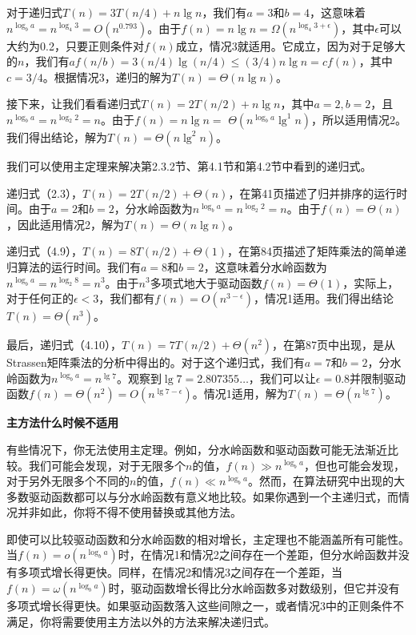 \documentclass[lang=cn,newtx,10pt,scheme=chinese]{elegantbook}
\begin{document}
对于递归式$T(n)=3 T(n / 4)+n \lg n$，我们有$a=3$和$b=4$，这意味着$n^{\log _b a}=n^{\log _4 3}=O\left(n^{0.793}\right)$。由于$f(n)=n \lg n=\Omega\left(n^{\log _4 3+\epsilon}\right)$，其中$\epsilon$可以大约为0.2，只要正则条件对$f(n)$成立，情况3就适用。它成立，因为对于足够大的$n$，我们有$a f(n / b)=3(n / 4) \lg (n / 4) \leq(3 / 4) n \lg n=c f(n)$，其中$c=3 / 4$。根据情况3，递归的解为$T(n)=\Theta(n \lg n)$。

接下来，让我们看看递归式$T(n)=2 T(n / 2)+n \lg n$，其中$a=2, b=2$，且$n^{\log _b a}=n^{\log _2 2}=n$。由于$f(n)=n \lg n=$ $\Theta\left(n^{\log _b a} \lg ^1 n\right)$，所以适用情况2。我们得出结论，解为$T(n)=\Theta\left(n \lg ^2 n\right)$。

我们可以使用主定理来解决第2.3.2节、第4.1节和第4.2节中看到的递归式。

递归式（2.3），$T(n)=2 T(n / 2)+\Theta(n)$，在第41页描述了归并排序的运行时间。由于$a=2$和$b=2$，分水岭函数为$n^{\log _b a}=n^{\log _2 2}=n$。由于$f(n)=\Theta(n)$，因此适用情况2，解为$T(n)=\Theta(n \lg n)$。

递归式（4.9），$T(n)=8 T(n / 2)+\Theta(1)$，在第84页描述了矩阵乘法的简单递归算法的运行时间。我们有$a=8$和$b=2$，这意味着分水岭函数为$n^{\log _b a}=n^{\log _2 8}=n^3$。由于$n^3$多项式地大于驱动函数$f(n)=\Theta(1)$，实际上，对于任何正的$\epsilon<3$，我们都有$f(n)=O\left(n^{3-\epsilon}\right)$，情况1适用。我们得出结论$T(n)=\Theta\left(n^3\right)$。

最后，递归式（4.10），$T(n)=7 T(n / 2)+\Theta\left(n^2\right)$，在第87页中出现，是从Strassen矩阵乘法的分析中得出的。对于这个递归式，我们有$a=7$和$b=2$，分水岭函数为$n^{\log _b a}=n^{\lg 7}$。观察到$\lg 7=2.807355 \ldots$，我们可以让$\epsilon=0.8$并限制驱动函数$f(n)=\Theta\left(n^2\right)=O\left(n^{\lg 7-\epsilon}\right)$。情况1适用，解为$T(n)=\Theta\left(n^{\lg 7}\right)$。

\textbf{主方法什么时候不适用}

有些情况下，你无法使用主定理。例如，分水岭函数和驱动函数可能无法渐近比较。我们可能会发现，对于无限多个$n$的值，$f(n) \gg n^{\log _b a}$，但也可能会发现，对于另外无限多个不同的$n$的值，$f(n) \ll n^{\log _b a}$。然而，在算法研究中出现的大多数驱动函数都可以与分水岭函数有意义地比较。如果你遇到一个主递归式，而情况并非如此，你将不得不使用替换或其他方法。

即使可以比较驱动函数和分水岭函数的相对增长，主定理也不能涵盖所有可能性。当$f(n)=o\left(n^{\log _b a}\right)$时，在情况1和情况2之间存在一个差距，但分水岭函数并没有多项式增长得更快。同样，在情况2和情况3之间存在一个差距，当$f(n)=\omega\left(n^{\log _b a}\right)$时，驱动函数增长得比分水岭函数多对数级别，但它并没有多项式增长得更快。如果驱动函数落入这些间隙之一，或者情况3中的正则条件不满足，你将需要使用主方法以外的方法来解决递归式。
\end{document}
